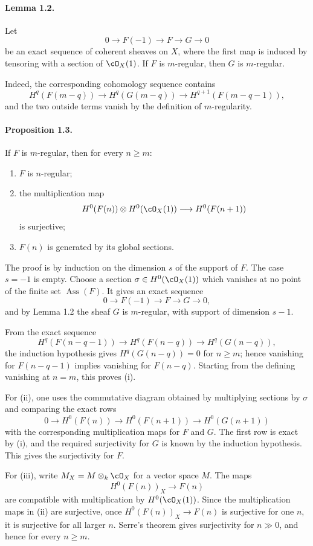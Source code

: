 \documentclass[11pt]{article}
\theoremstyle{plain}
\theoremstyle{definition}
\theoremstyle{remark}
\newcommand{\longto}{\longrightarrow}
\begin{document}
\paragraph{Lemma 1.2.}
Let
\[
0\to F(-1)\to F\to G\to0
\]
be an exact sequence of coherent sheaves on $X$, where the first map is induced by tensoring with a section of $\cO_X(1)$. If $F$ is $m$-regular, then $G$ is $m$-regular.

Indeed, the corresponding cohomology sequence contains
\[
H^q(F(m-q))\to H^q(G(m-q))\to H^{q+1}(F(m-q-1)),
\]
and the two outside terms vanish by the definition of $m$-regularity.

\paragraph{Proposition 1.3.}
If $F$ is $m$-regular, then for every $n\geq m$:
\begin{enumerate}[label=\roman*)]
\item $F$ is $n$-regular;
\item the multiplication map
\[
H^0(F(n))\otimes H^0(\cO_X(1))\longto H^0(F(n+1))
\]
is surjective;
\item $F(n)$ is generated by its global sections.
\end{enumerate}

The proof is by induction on the dimension $s$ of the support of $F$. The case $s=-1$ is empty. Choose a section $\sigma\in H^0(\cO_X(1))$ which vanishes at no point of the finite set $\operatorname{Ass}(F)$. It gives an exact sequence
\[
0\to F(-1)\to F\to G\to0,
\]
and by Lemma 1.2 the sheaf $G$ is $m$-regular, with support of dimension $s-1$.

From the exact sequence
\[
H^q(F(n-q-1))\to H^q(F(n-q))\to H^q(G(n-q)),
\]
the induction hypothesis gives $H^q(G(n-q))=0$ for $n\geq m$; hence vanishing for $F(n-q-1)$ implies vanishing for $F(n-q)$. Starting from the defining vanishing at $n=m$, this proves (i).

For (ii), one uses the commutative diagram obtained by multiplying sections by $\sigma$ and comparing the exact rows
\[
0\to H^0(F(n))\to H^0(F(n+1))\to H^0(G(n+1))
\]
with the corresponding multiplication maps for $F$ and $G$. The first row is exact by (i), and the required surjectivity for $G$ is known by the induction hypothesis. This gives the surjectivity for $F$.

For (iii), write $M_X=M\otimes_k\cO_X$ for a vector space $M$. The maps
\[
H^0(F(n))_X\longto F(n)
\]
are compatible with multiplication by $H^0(\cO_X(1))$. Since the multiplication maps in (ii) are surjective, once $H^0(F(n))_X\to F(n)$ is surjective for one $n$, it is surjective for all larger $n$. Serre's theorem gives surjectivity for $n\gg0$, and hence for every $n\geq m$.
\end{document}
